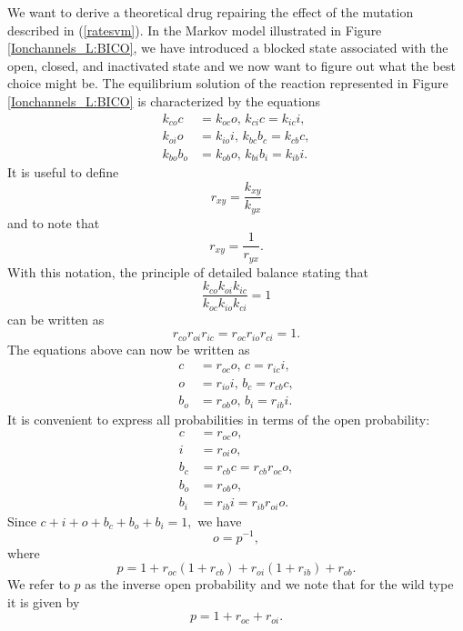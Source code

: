We want to derive a theoretical drug repairing the effect of the mutation described in (\ref{ratesvm}). In the Markov model
illustrated in Figure  \ref{Ionchannels_L:BICO}, we have introduced a blocked state associated with the open, closed, and inactivated state and
we now want to figure out what the best choice might be.
The equilibrium solution of the reaction represented in Figure \ref{Ionchannels_L:BICO} is characterized by the equations
\begin{align*}
k_{co}c &  =k_{oc}o,\, k_{ci}c   =k_{ic}i,\\
k_{oi}o &  =k_{io}i,\, k_{bc}b_{c}   =k_{cb}c,\\
k_{bo}b_{o} &  =k_{ob}o, \, k_{bi}b_{i}   =k_{ib}i.
\end{align*}
It is useful to define
\[
r_{xy}=\frac{k_{xy}}{k_{yx}}
\]
and to note that
\[
r_{xy}=\frac{1}{r_{yx}}.
\]
With this notation, the principle of detailed balance stating that
\[
\frac{k_{co}k_{oi}k_{ic}}{k_{oc}k_{io}k_{ci}}=1
\]
can be written as
\[
r_{co}r_{oi}r_{ic}=r_{oc}r_{io}r_{ci}=1.
\]
The equations above can now be written as
\begin{align*}
c &  =r_{oc}o,\, c   =r_{ic}i,\\
o &  =r_{io}i,\, b_{c}   =r_{cb}c,\\
b_{o} &  =r_{ob}o,\, b_{i}   =r_{ib}i.
\end{align*}
It is convenient to express all probabilities in terms of the open probability:
\begin{align*}
c &  =r_{oc}o,\\
i &  =r_{oi}o,\\
b_{c} &  =r_{cb}c=r_{cb}r_{oc}o,\\
b_{o} &  =r_{ob}o,\\
b_{i} &  =r_{ib}i=r_{ib}r_{oi}o.
\end{align*}
Since $c+i+o+b_{c}+b_{o}+b_{i}=1,$ we have
\[
o=p^{-1},
\]
where
\[
p    =1+r_{oc}\left(  1+r_{cb}\right)  +r_{oi}\left(  1+r_{ib}\right)  +r_{ob}.
\]
We refer to $p$ as the inverse open probability and we note that for the wild type
it is given by
\[
p=1+r_{oc}+r_{oi}.
\]

